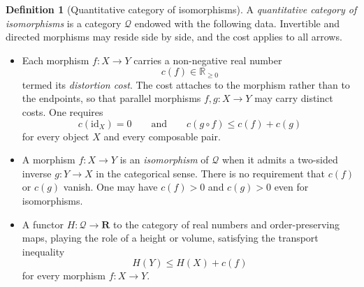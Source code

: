 \documentclass[10pt, reqno]{amsart}
\theoremstyle{plain}
\theoremstyle{definition}
\newtheorem{definition}[theorem]{Definition}
\theoremstyle{plain}
\newcommand{\R}{\mathbb{R}}
\begin{document}
\begin{definition}[Quantitative category of isomorphisms]\label{def:QuantitativeCategory}
A \emph{quantitative category of isomorphisms} is a category $\mathcal{Q}$ endowed with the following data. Invertible and directed morphisms may reside side by side, and the cost applies to all arrows.

\begin{itemize}
\item[(i)] Each morphism $f \colon X \to Y$ carries a non-negative real number
  \[
    c(f) \in \R_{\ge 0}
  \]
termed its \emph{distortion cost}. The cost attaches to the morphism rather than to the endpoints, so that parallel morphisms $f,g \colon X \to Y$ may carry distinct costs. One requires
  \[
    c(\mathrm{id}_X) = 0
    \qquad\text{and}\qquad
    c(g \circ f) \le c(f) + c(g)
  \]
for every object $X$ and every composable pair.

\item[(ii)] A morphism $f \colon X \to Y$ is an \emph{isomorphism} of $\mathcal{Q}$ when it admits a two-sided inverse $g \colon Y \to X$ in the categorical sense. There is no requirement that $c(f)$ or $c(g)$ vanish. One may have $c(f) > 0$ and $c(g) > 0$ even for isomorphisms.

\item[(iii)] A functor $H \colon \mathcal{Q} \to \mathbf{R}$ to the category of real numbers and order-preserving maps, playing the role of a height or volume, satisfying the transport inequality
  \[
    H(Y) \le H(X) + c(f)
  \]
for every morphism $f \colon X \to Y$.
\end{itemize}
\end{definition}
\end{document}

